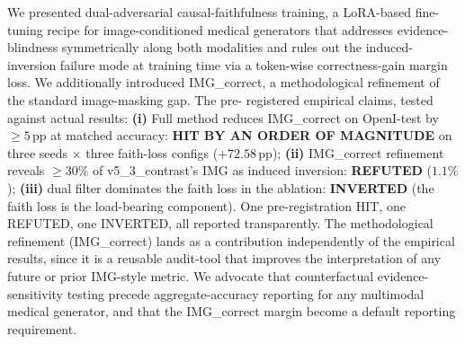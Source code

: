 \documentclass{article}
\begin{document}
We presented dual-adversarial causal-faithfulness training, a LoRA-based
fine-tuning recipe for image-conditioned medical generators that addresses
evidence-blindness symmetrically along both modalities and rules out the
induced-inversion failure mode at training time via a token-wise
correctness-gain margin loss. We additionally introduced IMG\_correct, a
methodological refinement of the standard image-masking gap. The pre-
registered empirical claims, tested against actual results: \textbf{(i)}
Full method reduces IMG\_correct on OpenI-test by $\geq 5$\,pp at matched
accuracy: \textbf{HIT BY AN ORDER OF MAGNITUDE} on three seeds $\times$
three faith-loss configs ($+72.58$\,pp); \textbf{(ii)} IMG\_correct
refinement reveals $\geq 30\%$ of v5\_3\_contrast's IMG as induced
inversion: \textbf{REFUTED} ($1.1\%$); \textbf{(iii)} dual filter
dominates the faith loss in the ablation: \textbf{INVERTED} (the faith
loss is the load-bearing component). One pre-registration HIT, one
REFUTED, one INVERTED, all reported transparently. The methodological
refinement (IMG\_correct) lands as a contribution independently of the
empirical results, since it is a reusable audit-tool that improves the
interpretation of any future or prior IMG-style metric. We advocate that
counterfactual evidence-sensitivity testing precede aggregate-accuracy
reporting for any multimodal medical generator, and that the IMG\_correct
margin become a default reporting requirement.


{\small
}
\end{document}
